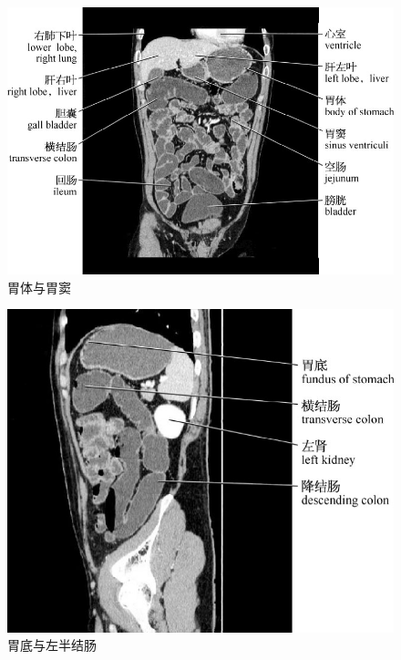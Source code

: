 \begin{figure}[!htbp]
 \centering
 \includegraphics{./images/Image00177.jpg}
 \captionsetup{justification=centering}
 \caption{胃体与胃窦}
  \end{figure} 
 \FloatBarrier

\begin{figure}[!htbp]
 \centering
 \includegraphics{./images/Image00178.jpg}
 \captionsetup{justification=centering}
 \caption{胃底与左半结肠}
  \end{figure} 
 \FloatBarrier

